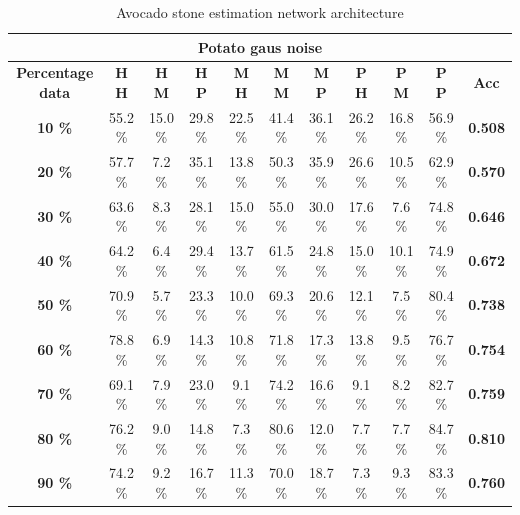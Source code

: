 \documentclass[11pt]{article}
\begin{document}
  \begin{table}[h!]
  \centering
  \begin{adjustbox}{max width=\textwidth}
  \begin{tabular}{*{11}{c}}%
  \hline
  \multicolumn{11}{c}{\textbf{Potato gaus noise}}
  \\
 \hline
 \textbf{Percentage data} & \textbf{H H} & \textbf{H M} & \textbf{H P} & \textbf{M H} & \textbf{M M} & \textbf{M P} & \textbf{P H} & \textbf{P M} & \textbf{P P} & \textbf{Acc}\\
 \hline
 \hline
 \textbf{10 \%}  & 55.2 \% & 15.0 \% & 29.8 \% & 22.5 \% & 41.4 \% & 36.1 \% & 26.2 \% & 16.8 \% & 56.9 \% & \textbf{0.508} \\
 \hline
 \textbf{20 \%} & 57.7 \% & 7.2 \% & 35.1 \% & 13.8 \% & 50.3 \% & 35.9 \% & 26.6 \% & 10.5 \% & 62.9 \% & \textbf{0.570} \\
 \hline
 \textbf{30 \%} & 63.6 \% & 8.3 \% & 28.1 \% & 15.0 \% & 55.0 \% & 30.0 \% & 17.6 \% & 7.6 \% & 74.8 \% & \textbf{0.646} \\
 \hline
 \textbf{40 \%} & 64.2 \% & 6.4 \% & 29.4 \% & 13.7 \% & 61.5 \% & 24.8 \% & 15.0 \% & 10.1 \%  & 74.9 \% & \textbf{0.672} \\
 \hline
 \textbf{50 \%} & 70.9 \% & 5.7 \% & 23.3 \% & 10.0 \% & 69.3 \% & 20.6 \% & 12.1 \% & 7.5 \% & 80.4 \% & \textbf{0.738} \\
 \hline
 \textbf{60 \%} & 78.8 \% & 6.9 \% & 14.3 \% & 10.8 \% & 71.8 \% & 17.3 \% & 13.8 \% & 9.5 \% & 76.7 \% & \textbf{0.754} \\
 \hline
 \textbf{70 \%} & 69.1 \% & 7.9 \% & 23.0 \% & 9.1 \% & 74.2 \% & 16.6 \% & 9.1 \% & 8.2 \% & 82.7 \% & \textbf{0.759} \\
 \hline
\textbf{80 \%} & 76.2 \% & 9.0 \% & 14.8 \%  & 7.3 \% & 80.6 \% & 12.0 \% & 7.7 \% & 7.7 \% & 84.7 \% & \textbf{0.810} \\
 \hline
 \textbf{90 \%} & 74.2 \% & 9.2 \% &16.7 \% & 11.3 \% & 70.0 \% & 18.7 \% & 7.3 \% & 9.3 \% & 83.3 \% & \textbf{0.760} \\
 \hline
\end{tabular}
\end{adjustbox}
  \caption{Avocado stone estimation network architecture}
  \label{tab:experiments_avo_cnn}
\end{table}
\end{document}
